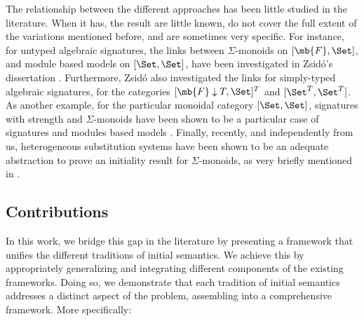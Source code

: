 %
The relationship between the different approaches has been little studied in the literature.
When it has, the result are little known, do not cover the full extent of the
variations mentioned before, and are sometimes very specific.
%
For instance, for untyped algebraic signatures, the links between $Σ$-monoids on $[\mb{F},\Set]$,
and module based models on $[\Set,\Set]$, have been investigated in Zsidó's
dissertation \cite{ZsidoPhd10}.
Furthermore, Zsidó also investigated the links for simply-typed algebraic signatures, for
the categories $[\mb{F} \downarrow T,\Set]^T$ and $[\Set^T,\Set^T]$.
%
As another example, for the particular monoidal category $[\Set,\Set]$, signatures with strength
and $Σ$-monoids have been shown to be a particular case of signatures and
modules based models \cite{HirschowitzMaggesi12}.
%
Finally, recently, and independently from us, heterogeneous substitution systems
have been shown to be an adequate abstraction to prove an initiality result
for $Σ$-monoids, as very briefly mentioned in \cite[Section 4.4]{HssNonWellfounded24}.


\subsection{Contributions}

In this work, we bridge this gap in the literature by presenting a framework
that unifies the different traditions of initial semantics.
%
We achieve this by appropriately generalizing and integrating different
components of the existing frameworks.
%
Doing so, we demonstrate that each tradition of initial semantics addresses a
distinct aspect of the problem, assembling into a comprehensive framework.
%
More specifically:

